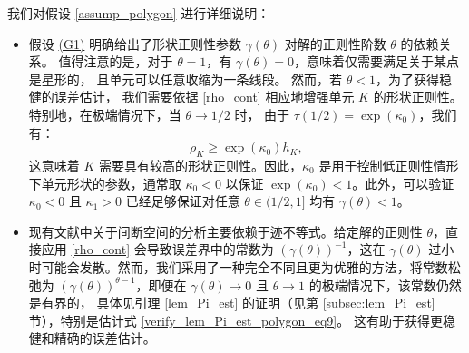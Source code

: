 \begin{remark}%
\label{rem_assum_polygon1}

我们对假设 \ref{assump_polygon} 进行详细说明：
\begin{itemize}

\item {假设 \hyperref[asp:polygonG1]{(G1)} 明确给出了形状正则性参数
$\gamma(\theta)$ 对解的正则性阶数 $\theta$ 的依赖关系。} 值得注意的是，对于
$\theta=1$，有 $\gamma(\theta) = 0$，意味着仅需要满足关于某点是星形的，
且单元可以任意收缩为一条线段。
然而，若 $\theta<1$，为了获得稳健的误差估计，
我们需要依据 \eqref{rho_cont} 相应地增强单元 $K$ 的形状正则性。
特别地，在极端情况下，当 $\theta\rightarrow 1/2$ 时，
由于 $\tau(1/2)=\exp(\kappa_0)$，我们有：
\begin{equation}
\label{kappa_0}
\rho_K \ge \exp(\kappa_0) h_K,
\end{equation}
这意味着 $K$ 需要具有较高的形状正则性。因此，$\kappa_0$ 是用于控制低正则性情形下单元形状的参数，通常取 $\kappa_0<0$ 以保证 $\exp(\kappa_0)<1$。此外，可以验证 $\kappa_0<0$ 且 $\kappa_1>0$ 已经足够保证对任意 $\theta\in(1/2,1]$ 均有 $\gamma(\theta)<1$。

\vspace{0.1in}

\item 现有文献中关于间断空间的分析主要依赖于迹不等式。给定解的正则性 $\theta$，直接应用 \eqref{rho_cont} 会导致误差界中的常数为 $(\gamma(\theta))^{-1}$，这在 $\gamma(\theta)$ 过小时可能会发散。然而，我们采用了一种完全不同且更为优雅的方法，将常数松弛为 $(\gamma(\theta))^{\theta-1}$，即便在 $\gamma(\theta)\rightarrow 0$ 且 $\theta \rightarrow 1$ 的极端情况下，该常数仍然是有界的，
{具体见引理 \ref{lem_Pi_est} 的证明（见第 \ref{subsec:lem_Pi_est} 节），特别是估计式 \eqref{verify_lem_Pi_est_polygon_eq9}。}
这有助于获得更稳健和精确的误差估计。


\end{itemize}
\end{remark}
